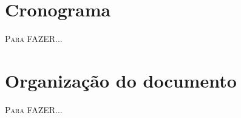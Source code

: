 

\section{Cronograma}
\lettrine{P}{ara} FAZER...

\section{Organização do documento}
\lettrine{P}{ara} FAZER...
